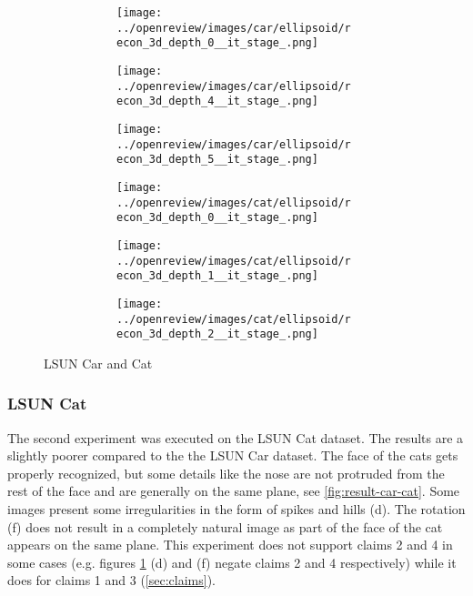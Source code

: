 \begin{figure}[h]
\begin{subfigure}{0.80\textwidth}
        \begin{subfigure}{0.16\textwidth}
            \centering
            \texttt{[image: ../openreview/images/car/ellipsoid/recon\_3d\_depth\_0\_\_it\_stage\_.png]}
            \caption{}
        \end{subfigure}
        \begin{subfigure}{0.16\textwidth}
            \centering
            \texttt{[image: ../openreview/images/car/ellipsoid/recon\_3d\_depth\_4\_\_it\_stage\_.png]}
            \caption{}
        \end{subfigure}
        \begin{subfigure}{0.16\textwidth}
            \centering
            \texttt{[image: ../openreview/images/car/ellipsoid/recon\_3d\_depth\_5\_\_it\_stage\_.png]}
            \caption{}
        \end{subfigure}
        \begin{subfigure}{0.16\textwidth}
            \centering
            \texttt{[image: ../openreview/images/cat/ellipsoid/recon\_3d\_depth\_0\_\_it\_stage\_.png]}
            \caption{}
        \end{subfigure}
        \begin{subfigure}{0.16\textwidth}
            \centering
            \texttt{[image: ../openreview/images/cat/ellipsoid/recon\_3d\_depth\_1\_\_it\_stage\_.png]}
            \caption{}
        \end{subfigure}
        \begin{subfigure}{0.16\textwidth}
            \centering
            \texttt{[image: ../openreview/images/cat/ellipsoid/recon\_3d\_depth\_2\_\_it\_stage\_.png]}
            \caption{}
        \end{subfigure}
    
    \end{subfigure}
    \caption{LSUN Car and Cat}
    \label{fig:result-car-cat}
\end{figure}
\subsubsection{LSUN Cat}
The second experiment was executed on the LSUN Cat dataset. The results are a slightly poorer compared to the the LSUN Car dataset. The face of the cats gets properly recognized, but some details like the nose are not protruded from the rest of the face and are generally on the same plane, see \autoref{fig:result-car-cat}. Some images present some irregularities in the form of spikes and hills (d). The rotation (f) does not result in a completely natural image as part of the face of the cat appears on the same plane. This experiment does not support claims 2 and 4 in some cases (e.g. figures \ref{fig:result-car-cat} (d) and (f) negate claims 2 and 4 respectively) while it does for claims 1 and 3 (\autoref{sec:claims}).
